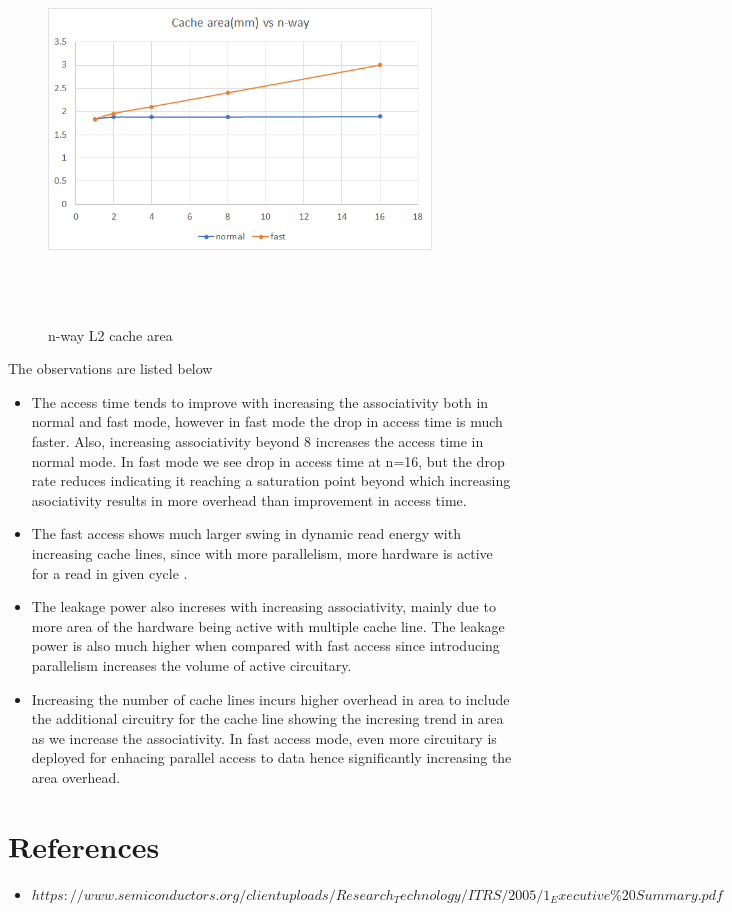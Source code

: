 \documentclass{tufte-handout}
\begin{document}
		\begin{figure}[h!]
		\label{fig:cachearea}
		\centering
		\includegraphics[width = 4in, height = 4in]{cachearea}
		\caption{n-way L2 cache area }
		\end{figure}

		The observations are listed below
		\begin{itemize}
			\item The access time tends to improve with increasing the associativity both in normal and fast mode, however in fast mode the drop in access time is much faster. Also, increasing associativity beyond 8 increases the access time in normal mode. In fast mode we see drop in access time at n=16, but the drop rate reduces indicating it reaching a saturation point beyond which increasing asociativity results in more overhead than improvement in access time.
			\item The fast access shows much larger swing in dynamic read energy with increasing cache lines, since with more parallelism, more hardware is active for a read in given cycle .
			\item The leakage power also increses with increasing associativity, mainly due to more area of the hardware being active with multiple cache line. The leakage power is also much higher when compared with fast access since introducing parallelism increases the volume of active circuitary.
			\item Increasing the number of cache lines incurs higher overhead in area to include the additional circuitry for the cache line showing the incresing trend in area as we increase the associativity. In fast access mode, even more circuitary is deployed for enhacing parallel access to data hence significantly increasing the area overhead.
		\end{itemize}

		\section{$\textbf{References}$}
		\begin{itemize}
			\item $https://www.semiconductors.org/clientuploads/Research_Technology/ITRS/2005/1_Executive\%20Summary.pdf$
		\end{itemize}






  
  
  
  
\end{document}

